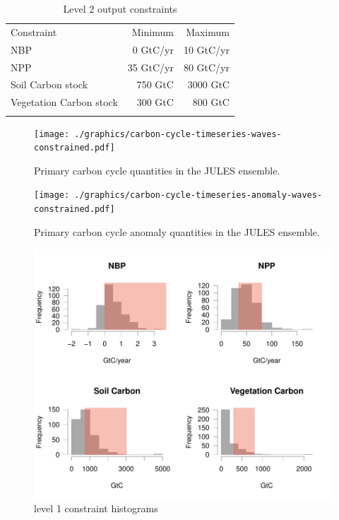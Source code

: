 \documentclass[gmd, manuscript]{copernicus}
\begin{document}
\begin{table}[t]
\caption{Level 2 output constraints}
\label{table:level_2_constraints}
\begin{tabular}{l r r}
\tophline
Constraint & Minimum & Maximum \\ 
\middlehline
NBP & 0 GtC/yr &  10 GtC/yr\\
NPP & 35 GtC/yr & 80 GtC/yr \\
Soil Carbon stock & 750 GtC &  3000 GtC\\ 
Vegetation Carbon stock & 300 GtC & 800 GtC \\

\bottomhline
\end{tabular}
\belowtable{} %

\end{table}


%
\begin{figure}[t]
\texttt{[image: ./graphics/carbon-cycle-timeseries-waves-constrained.pdf]}
\caption{Primary carbon cycle quantities in the JULES ensemble.}
\label{fig:carbon-cycle-timeseries-waves-constrained}
\end{figure}

%
\begin{figure}[t]
\texttt{[image: ./graphics/carbon-cycle-timeseries-anomaly-waves-constrained.pdf]}
\caption{Primary carbon cycle anomaly quantities in the JULES ensemble.}
\label{fig:carbon-cycle-timeseries-anomaly-waves-constrained}
\end{figure}


\begin{figure}[t]
\includegraphics[width=12cm]{./graphics/level_2_constraints_hists.pdf}
\caption{level 1 constraint histograms}
\label{fig:level_2_constraints_hists}
\end{figure}
\end{document}
